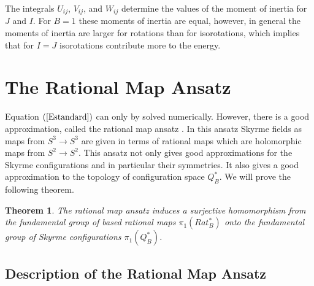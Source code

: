 \documentclass[a4paper,12pt]{article}
\newtheorem {theorem}{Theorem}[section]
\begin{document}
The integrals $U_{ij}$, $V_{ij}$, and $W_{ij}$ determine the values 
of the moment of inertia for $J$ and $I$. For $B=1$ these moments 
of inertia are equal, however, in general the moments of inertia 
are larger for rotations than for isorotations, which implies that 
for $I=J$ isorotations contribute more to the energy.


\section{The Rational Map Ansatz}
\label{Rational}

Equation $(\ref{Estandard})$ can only by solved numerically. However,
there is a good approximation, called the rational map ansatz
\cite{Houghton:1998kg}. In this ansatz Skyrme fields as maps from $S^3
\to S^3$ are given in terms of rational maps which are holomorphic
maps from $S^2 \to S^2$. 
This ansatz not only gives good approximations for 
the Skyrme configurations and in particular their symmetries. It 
also gives a good approximation to the topology of configuration 
space $Q_B^*$. We will prove the following theorem.

\begin{theorem}
\label{t:FR}
The rational map ansatz induces a surjective homomorphism from the 
fundamental group of 
based rational maps $\pi_1(Rat_B^*)$ onto the fundamental group of 
Skyrme configurations $\pi_1(Q_B^*)$. 
\end{theorem}

\subsection{Description of the Rational Map Ansatz}
\label{Ransatz}
\end{document}
